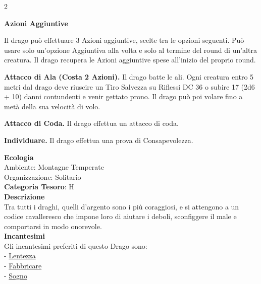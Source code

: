 \begin{multicols}{2}
{\textbf{Azioni Aggiuntive}

Il drago può effettuare 3 Azioni aggiuntive, scelte tra le opzioni seguenti. Può usare solo un'opzione Aggiuntiva alla volta e solo al termine del round di un'altra creatura. Il drago recupera le Azioni aggiuntive spese all'inizio del proprio round.

\textbf{Attacco di Ala (Costa 2 Azioni).} Il drago batte le ali. Ogni creatura entro 5 metri dal drago deve riuscire un Tiro Salvezza su Riflessi DC 36 o subire 17 (2d6 + 10) danni contundenti e venir gettato prono. Il drago può poi volare fino a metà della sua velocità di volo.

\textbf{Attacco di Coda.} Il drago effettua un attacco di coda.

\textbf{Individuare.} Il drago effettua una prova di Consapevolezza.

\textbf{Ecologia}\\
Ambiente: Montagne Temperate\\
Organizzazione: Solitario\\
\textbf{Categoria Tesoro}: H\\
\textbf{Descrizione}\\
Tra tutti i draghi, quelli d'argento sono i più coraggiosi, e si attengono a un codice cavalleresco che impone loro di aiutare i deboli, sconfiggere il male e comportarsi in modo onorevole.\\
\textbf{Incantesimi}\\
Gli incantesimi preferiti di questo Drago sono:\\
- \hyperlink{lentezza}{Lentezza}\\
- \hyperlink{Fabbricare}{Fabbricare}\\
- \hyperlink{Sogno}{Sogno}

%

}
\end{multicols}
